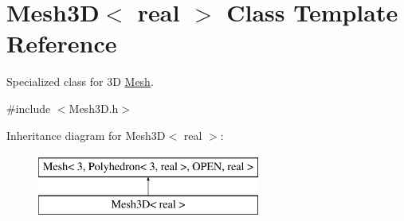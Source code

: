 \hypertarget{class_mesh3_d}{\section{\-Mesh3\-D$<$ real $>$ \-Class \-Template \-Reference}
\label{class_mesh3_d}
}


\-Specialized class for 3\-D \hyperlink{class_mesh}{\-Mesh}.  




{\ttfamily \#include $<$\-Mesh3\-D.\-h$>$}

\-Inheritance diagram for \-Mesh3\-D$<$ real $>$\-:\begin{figure}[H]
\begin{center}
\leavevmode
\includegraphics[height=2.000000cm]{class_mesh3_d}
\end{center}
\end{figure}
